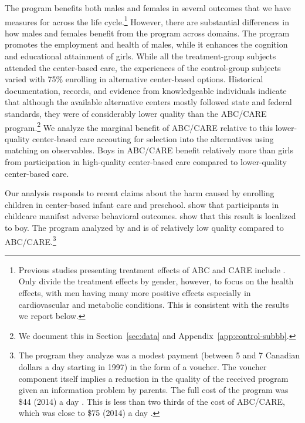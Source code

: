 The program benefits both males and females in several outcomes that we have measures for across the life cycle.\footnote{Previous studies presenting treatment effects of ABC and CARE include \citet{Ramey_etal_1985_Project-CARE_TiECSE,Clarke_Campbell_1998_ABC_Comparison_ECRQ,Campbell_Pungello_etal_2001_DP,Campbell_Ramey_etal_2002_ADS,Campbell_Wasik_etal_2008_ECRQ,Campbell_Conti_etal_2014_EarlyChildhoodInvestments}. Only \citet{Campbell_Conti_etal_2014_EarlyChildhoodInvestments} divide the treatment effects by gender, however, to focus on the health effects, with men having many more positive effects especially in cardiovascular and metabolic conditions. This is consistent with the results we report below.} However, there are substantial differences in how males and females benefit from the program across domains. The program promotes the employment and health of males, while it enhances the cognition and educational attainment of girls. While all the treatment-group subjects attended the center-based care, the experiences of the control-group subjects varied with 75\% enrolling in alternative center-based options. Historical documentation, records, and evidence from knowledgeable individuals indicate that although the available alternative centers mostly followed state and federal standards, they were of considerably lower quality than the ABC/CARE program.\footnote{We document this in Section~\ref{sec:data} and Appendix~\ref{app:control-subbb}.} We analyze the marginal benefit of ABC/CARE relative to this lower-quality center-based care accouting for selection into the alternatives using matching on observables. Boys in ABC/CARE benefit relatively more than girls from participation in high-quality center-based care compared to lower-quality center-based care.

Our analysis responds to recent claims about the harm caused by enrolling children in center-based infant care and preschool. \citet{Baker_Gruber_etal_2008_JPE} show that participants in childcare manifest adverse behavioral outcomes. \citet{Kottelenberg_Lehrer_2014_Gender-Effects} show that this result is localized to boy. The program analyzed by \citet{Baker_Gruber_etal_2008_JPE} and \citet{Kottelenberg_Lehrer_2014_Gender-Effects} is of relatively low quality compared to ABC/CARE.\footnote{The program they analyze was a modest payment (between 5 and 7 Canadian dollars a day starting in 1997) in the form of a voucher. The voucher component itself implies a reduction in the quality of the received program given an information problem by parents. The full cost of the program was \$44 (2014) a day \citep{Baker_etal_2005_Universal_Childcare_NBER}. This is less than two thirds of the cost of ABC/CARE, which was close to \$75 (2014) a day \citep{Garcia_Heckman_Leaf_etal_2017_Comp_CBA_Unpublished}.}

